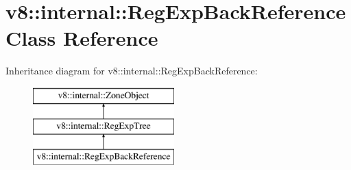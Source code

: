 \hypertarget{classv8_1_1internal_1_1_reg_exp_back_reference}{}\section{v8\+:\+:internal\+:\+:Reg\+Exp\+Back\+Reference Class Reference}
\label{classv8_1_1internal_1_1_reg_exp_back_reference}
Inheritance diagram for v8\+:\+:internal\+:\+:Reg\+Exp\+Back\+Reference\+:\begin{figure}[H]
\begin{center}
\leavevmode
\includegraphics[height=3.000000cm]{classv8_1_1internal_1_1_reg_exp_back_reference}
\end{center}
\end{figure}
